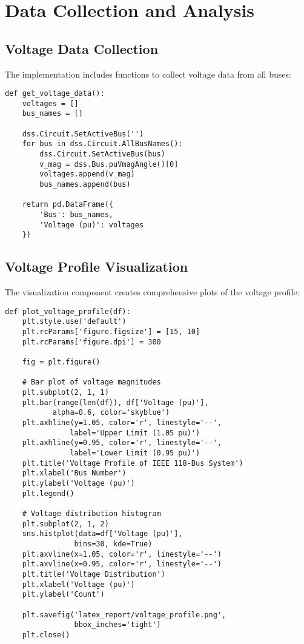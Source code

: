 \documentclass[11pt]{article}
\begin{document}
\section{Data Collection and Analysis}

\subsection{Voltage Data Collection}
The implementation includes functions to collect voltage data from all buses:

\begin{lstlisting}[caption=Voltage Data Collection Function]
def get_voltage_data():
    voltages = []
    bus_names = []
    
    dss.Circuit.SetActiveBus('')
    for bus in dss.Circuit.AllBusNames():
        dss.Circuit.SetActiveBus(bus)
        v_mag = dss.Bus.puVmagAngle()[0]
        voltages.append(v_mag)
        bus_names.append(bus)
    
    return pd.DataFrame({
        'Bus': bus_names,
        'Voltage (pu)': voltages
    })
\end{lstlisting}

\subsection{Voltage Profile Visualization}
The visualization component creates comprehensive plots of the voltage profile:

\begin{lstlisting}[caption=Voltage Profile Visualization Function]
def plot_voltage_profile(df):
    plt.style.use('default')
    plt.rcParams['figure.figsize'] = [15, 10]
    plt.rcParams['figure.dpi'] = 300
    
    fig = plt.figure()
    
    # Bar plot of voltage magnitudes
    plt.subplot(2, 1, 1)
    plt.bar(range(len(df)), df['Voltage (pu)'],
           alpha=0.6, color='skyblue')
    plt.axhline(y=1.05, color='r', linestyle='--',
               label='Upper Limit (1.05 pu)')
    plt.axhline(y=0.95, color='r', linestyle='--',
               label='Lower Limit (0.95 pu)')
    plt.title('Voltage Profile of IEEE 118-Bus System')
    plt.xlabel('Bus Number')
    plt.ylabel('Voltage (pu)')
    plt.legend()
    
    # Voltage distribution histogram
    plt.subplot(2, 1, 2)
    sns.histplot(data=df['Voltage (pu)'],
                bins=30, kde=True)
    plt.axvline(x=1.05, color='r', linestyle='--')
    plt.axvline(x=0.95, color='r', linestyle='--')
    plt.title('Voltage Distribution')
    plt.xlabel('Voltage (pu)')
    plt.ylabel('Count')
    
    plt.savefig('latex_report/voltage_profile.png',
                bbox_inches='tight')
    plt.close()
\end{lstlisting}
\end{document}

